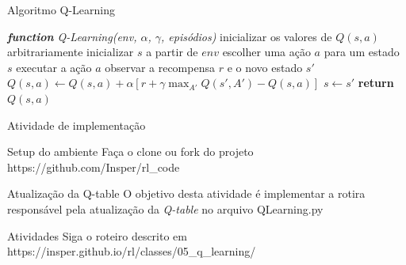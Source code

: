 \documentclass{beamer}
\begin{document}
\begin{frame}{Algoritmo Q-Learning} 
	\begin{algorithmic} 
		\STATE \emph{\textbf{function} Q-Learning(env, $\alpha$, $\gamma$, episódios)}
		\STATE inicializar os valores de $Q(s, a)$ arbitrariamente
		\STATE inicializar $s$ a partir de $env$
		\REPEAT
		\STATE escolher uma ação $a$ para um estado $s$
		\STATE executar a ação $a$
		\STATE observar a recompensa $r$ e o novo estado $s'$ 
		\STATE $Q(s,a) \leftarrow Q(s,a) + \alpha [r +\gamma \max_{A'}{Q(s', A')} - Q(s,a)]$
		\STATE$s  \leftarrow s'$
		\ENDFOR
		\STATE \textbf{return} $Q(s, a)$
	\end{algorithmic}
\end{frame}


\begin{frame}{Atividade de implementação}
	
	\begin{block}{Setup do ambiente}
		Faça o clone ou fork do projeto https://github.com/Insper/rl\_code
		\href{https://github.com/Insper/rl_code}{\beamergotobutton{Link}}
	\end{block}
	
	\begin{alertblock}{Atualização da Q-table}
		O objetivo desta atividade é implementar a rotira responsável pela atualização da \textit{Q-table} no arquivo QLearning.py
	\end{alertblock}
	
	\begin{block}{Atividades}
		Siga o roteiro descrito em https://insper.github.io/rl/classes/05\_q\_learning/ \href{https://insper.github.io/rl/classes/05_q_learning/}
		{\beamergotobutton{Link}}
	\end{block}

\end{frame}

%
%
\end{document}

